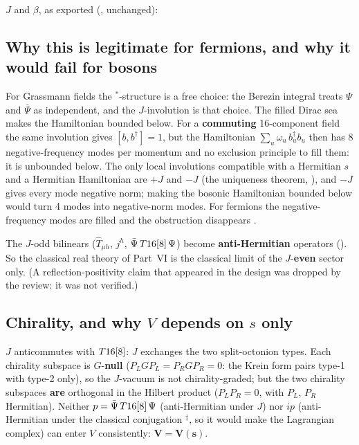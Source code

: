 $J$ and $\beta$, as exported (, unchanged):

{\small

}

\subsection{Why this is legitimate for fermions, and why it would fail for bosons}
\label{sec:6.6}

For Grassmann fields the ${}^{*}$-structure is a free choice: the Berezin integral treats $\Psi$ and
$\bar\Psi$ as independent, and the $J$-involution is that choice. The filled Dirac sea makes the
Hamiltonian bounded below. For a \textbf{commuting} 16-component field the same involution gives
$[b,b^{\dagger}]=1$, but the Hamiltonian $\sum_u\omega_u\,b_u^{\dagger}b_u$ then has 8
negative-frequency modes per momentum and no exclusion principle to fill them: it is unbounded
below. The only local involutions compatible with a Hermitian $s$ and a Hermitian Hamiltonian are
$+J$ and $-J$ (the uniqueness theorem, ), and $-J$ gives every mode negative norm;
making the bosonic Hamiltonian bounded below would turn 4 modes into negative-norm modes. For
fermions the negative-frequency modes are filled and the obstruction disappears .

The $J$-odd bilinears ($\hat T_{\mu h}$, $j^h$, $\bar\Psi\,T16[8]\,\Psi$) become
\textbf{anti-Hermitian} operators (). So the classical real theory of Part~VI is the
classical limit of the $J$-\textbf{even} sector only. (A reflection-positivity claim that appeared in
the design was dropped by the review: it was not verified.)

\subsection{Chirality, and why \texorpdfstring{$V$}{V} depends on \texorpdfstring{$s$}{s} only}
\label{sec:6.7}

$J$ anticommutes with $T16[8]$: $J$ exchanges the two split-octonion types. Each chirality subspace
is $G$-\textbf{null} ($P_L G P_L=P_R G P_R=0$: the Krein form pairs type-1 with type-2 only), so the
$J$-vacuum is not chirality-graded; but the two chirality subspaces \textbf{are} orthogonal in the
Hilbert product ($P_LP_R=0$, with $P_L$, $P_R$ Hermitian). Neither $p=\bar\Psi\,T16[8]\,\Psi$
(anti-Hermitian under $J$) nor $ip$ (anti-Hermitian under the classical conjugation ${}^{\ddagger}$,
so it would make the Lagrangian complex) can enter $V$ consistently: $\boldsymbol{V=V(s)}$.
 

